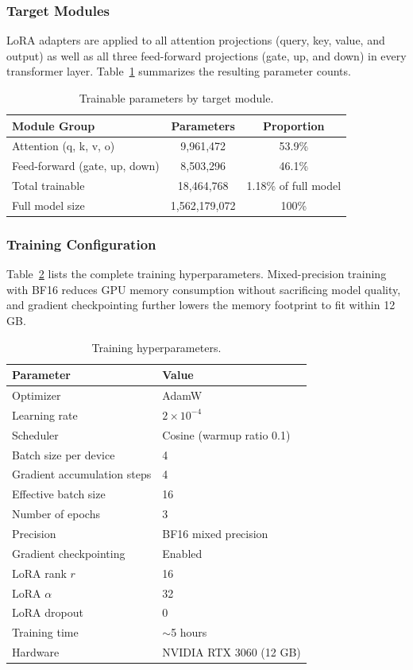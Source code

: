 \documentclass[11pt,a4paper]{article}
\begin{document}
\subsubsection{Target Modules}

LoRA adapters are applied to all attention projections (query, key, value, and output) as well as all three feed-forward projections (gate, up, and down) in every transformer layer. Table~\ref{tab:lora_params} summarizes the resulting parameter counts.

\begin{table}[ht]
\centering
\caption{Trainable parameters by target module.}
\label{tab:lora_params}
\begin{tabular}{lcc}
\toprule
\textbf{Module Group} & \textbf{Parameters} & \textbf{Proportion} \\
\midrule
Attention (q, k, v, o) & 9,961,472 & 53.9\% \\
Feed-forward (gate, up, down) & 8,503,296 & 46.1\% \\
\midrule
Total trainable & 18,464,768 & 1.18\% of full model \\
Full model size & 1,562,179,072 & 100\% \\
\bottomrule
\end{tabular}
\end{table}

\subsubsection{Training Configuration}

Table~\ref{tab:training_config} lists the complete training hyperparameters. Mixed-precision training with BF16 reduces GPU memory consumption without sacrificing model quality, and gradient checkpointing further lowers the memory footprint to fit within 12 GB.

\begin{table}[ht]
\centering
\caption{Training hyperparameters.}
\label{tab:training_config}
\begin{tabular}{ll}
\toprule
\textbf{Parameter} & \textbf{Value} \\
\midrule
Optimizer & AdamW \\
Learning rate & $2 \times 10^{-4}$ \\
Scheduler & Cosine (warmup ratio 0.1) \\
Batch size per device & 4 \\
Gradient accumulation steps & 4 \\
Effective batch size & 16 \\
Number of epochs & 3 \\
Precision & BF16 mixed precision \\
Gradient checkpointing & Enabled \\
LoRA rank $r$ & 16 \\
LoRA $\alpha$ & 32 \\
LoRA dropout & 0 \\
\midrule
Training time & $\sim$5 hours \\
Hardware & NVIDIA RTX 3060 (12 GB) \\
\bottomrule
\end{tabular}
\end{table}
\end{document}
